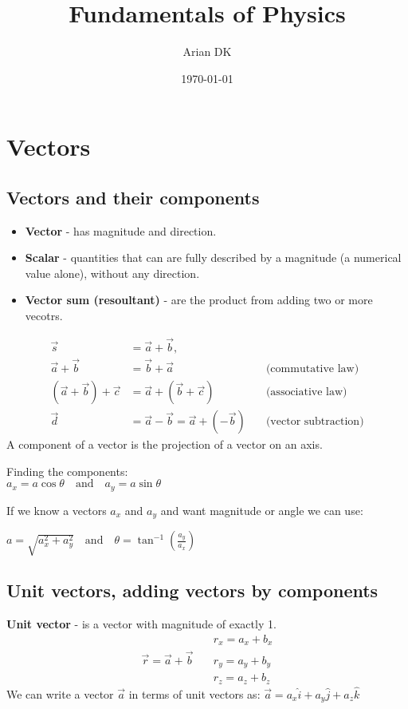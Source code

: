 \documentclass[fleqn]{article}
\title{Fundamentals of Physics}
\author{Arian DK}
\date{\today}
\begin{document}
\setcounter{section}{2}

\maketitle

\section{Vectors}

\subsection{Vectors and their components}
\begin{itemize}
    \item \textbf{Vector} - has magnitude and direction.
    \item \textbf{Scalar} - quantities that can are fully described by a magnitude (a numerical value alone), without any direction.
    \item \textbf{Vector sum (resoultant)} - are the product from adding two or more vecotrs.
\end{itemize}
\begin{align*}
\vec{s} &= \vec{a} + \vec{b}, \\[6pt]
\vec{a} + \vec{b} &= \vec{b} + \vec{a} \quad &\text{(commutative law)} \\[6pt]
(\vec{a} + \vec{b}) + \vec{c} &= \vec{a} + (\vec{b} + \vec{c}) \quad &\text{(associative law)} \\[6pt]
\vec{d} &= \vec{a} - \vec{b} = \vec{a} + (-\vec{b}) \quad &\text{(vector subtraction)}
\end{align*}
A component of a vector is the projection of a vector on an axis.
\begin{center}
Finding the components:\\
$a_x = a\cos\theta 
\quad \text{and} \quad 
a_y = a\sin\theta$
\end{center}
If we know a vectors $a_x$ and $a_y$ and want magnitude or angle we can use:
\begin{center}
$a = \sqrt{a^2_x + a^2_y} \quad \text{and} \quad \theta = \tan^{-1}(\frac{a_y}{a_x})$
\end{center}

\subsection{Unit vectors, adding vectors by components}
\textbf{Unit vector} - is a vector with magnitude of exactly 1.
\begin{align*}
      & r_x = a_x + b_x \\
\vec{r} = \vec{a} + \vec{b} \quad & r_y = a_y + b_y \\
      & r_z = a_z + b_z
\end{align*}
We can write a vector $\vec{a}$ in terms of unit vectors as: $\vec{a} = a_x \hat{i} + a_y \hat{j} + a_z \hat{k}$
\end{document}
